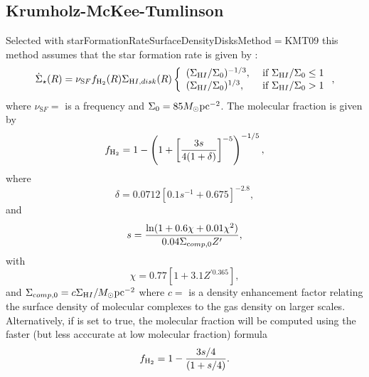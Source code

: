 \subsection{Krumholz-McKee-Tumlinson}\label{sec:StarFormationKMT09}

Selected with {\normalfont \ttfamily starFormationRateSurfaceDensityDisksMethod}$=${\normalfont \ttfamily KMT09} this method assumes that the star formation rate is given by \citep{krumholz_star_2009}:
\begin{equation}
 \dot{\Sigma}_\star(R) = \nu_{\mathrm SF} f_{\mathrm H_2}(R)\Sigma_{\mathrm HI, disk}(R) \left\{ \begin{array}{ll} (\Sigma_{\mathrm HI}/\Sigma_0)^{-1/3}, &  \hbox{ if } \Sigma_{\mathrm HI}/\Sigma_0 \le 1 \\ (\Sigma_{\mathrm HI}/\Sigma_0)^{1/3}, & \hbox{ if } \Sigma_{\mathrm HI}/\Sigma_0 > 1 \end{array} \right. ,
\end{equation}
where $\nu_{\mathrm SF}=${\normalfont \ttfamily [starFormationFrequencyKMT09]} is a frequency and $\Sigma_0=85 M_\odot \hbox{pc}^{-2}$. The molecular fraction is given by
\begin{equation}
 f_{\mathrm H_2} = 1 - \left( 1 + \left[ { 3 s \over 4 (1+\delta)} \right]^{-5} \right)^{-1/5},
\end{equation}
where
\begin{equation}
 \delta = 0.0712 \left[ 0.1 s^{-1} + 0.675 \right]^{-2.8},
\end{equation}
and
\begin{equation}
 s = {\ln(1+0.6\chi+0.01\chi^2) \over 0.04 \Sigma_{\mathrm comp,0} Z^\prime},
\end{equation}
with
\begin{equation}
 \chi = 0.77 \left[ 1 + 3.1 Z^{\prime 0.365} \right],
\end{equation}
and $\Sigma_{\mathrm comp,0}=c \Sigma_{\mathrm HI}/M_\odot \hbox{pc}^{-2}$ where $c=${\normalfont \ttfamily [molecularComplexClumpingFactorKMT09]} is a density enhancement factor relating the surface density of molecular complexes to the gas density on larger scales. Alternatively, if {\normalfont \ttfamily [molecularFractionFastKMT09]} is set to true, the molecular fraction will be computed using the faster (but less acccurate at low molecular fraction) formula
\begin{equation}
 f_{\mathrm H_2} = 1 - { 3s/4 \over (1 + s/4)}.
\end{equation}


